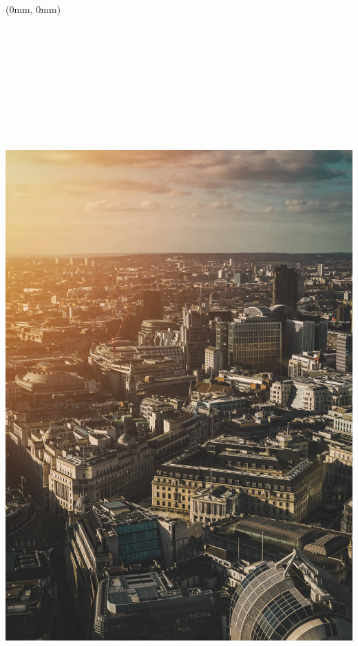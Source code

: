 \documentclass[
  a4paper,
  twoside, 11pt]{article}
\author{}
\date{\vspace{-2.5em}}
\begin{document}
\frenchspacing

\raggedright

\raggedbottom

\begin{textblock*}{21cm}(0mm, 0mm)
\includegraphics[width=21cm,height=29.7cm]{2020_q4/cover_image_2020_q4.jpg}
\end{textblock*}
\end{document}
